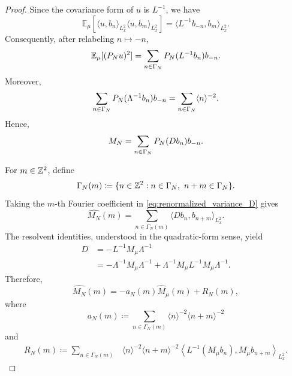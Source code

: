 \begin{proof}
    Since the covariance form of \(u\) is \(L^{-1}\), we have
    \[
        \mathbb E_\mu
        \left[
            \langle u,b_n\rangle_{L^2_x}
            \langle u,b_m\rangle_{L^2_x}
        \right]
        =
        \langle L^{-1}b_{-n},b_m\rangle_{L^2_x}.
    \]
    Consequently, after relabeling \(n\mapsto-n\),
    \[
        \mathbb E_\mu[(\P_Nu)^2]
        =
        \sum_{n\in\Gamma_N}
        \P_N(L^{-1}b_n)b_{-n}.
    \]
    Moreover,
    \[
        \sum_{n\in\Gamma_N}
        \P_N(\Lambda^{-1}b_n)b_{-n}
        =
        \sum_{n\in\Gamma_N}\langle n\rangle^{-2}.
    \]
    Hence,
    \begin{equation}\label{eq:renormalized_variance_D}
        M_N
        =
        \sum_{n\in\Gamma_N}
        \P_N(Db_n)b_{-n}.
    \end{equation}

    For \(m\in\Z^2\), define
    \[
        \Gamma_N(m)
        \coloneqq
        \{n\in\Z^2:
            n\in\Gamma_N,\ n+m\in\Gamma_N
        \}.
    \]
    Taking the \(m\)-th Fourier coefficient in
    \eqref{eq:renormalized_variance_D} gives
    \begin{equation}\label{eq:renormalized_variance_fourier}
        \widehat{M_N}(m)
        =
        \sum_{n\in\Gamma_N(m)}
        \langle Db_n,b_{n+m}\rangle_{L^2_x}.
    \end{equation}
    The resolvent identities, understood in the quadratic-form sense,
    yield
    \begin{align*}
        D
        &=
        -L^{-1}M_\mu\Lambda^{-1}
        \\
        &=
        -\Lambda^{-1}M_\mu\Lambda^{-1}
        +
        \Lambda^{-1}M_\mu
        L^{-1}M_\mu\Lambda^{-1}.
    \end{align*}
    Therefore,
    \[
        \widehat{M_N}(m)
        =
        -a_N(m)\widehat M_\mu(m)+R_N(m),
    \]
    where
    \[
        a_N(m)
        \coloneqq
        \sum_{n\in\Gamma_N(m)}
        \langle n\rangle^{-2}
        \langle n+m\rangle^{-2}
    \]
    and
    \begin{align*}
        R_N(m)
        \coloneqq
        \sum_{n\in\Gamma_N(m)}
        &\langle n\rangle^{-2}
        \langle n+m\rangle^{-2}
        \left\langle
            L^{-1}(M_\mu b_n),
            M_\mu b_{n+m}
        \right\rangle_{L^2_x}.
    \end{align*}


\end{proof}
